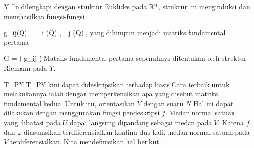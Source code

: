 \mavergleichskette
{\vergleichskette
{ Y
}
{ \subseteq }{ \R^n
}
{  }{
}
{    }{
}
{   }{
}
}
{}{}{}
dilengkapi dengan struktur Euklides pada ${\mathbb R}^n$, struktur ini menginduksi
dan menghasilkan fungsi-fungsi

\mavergleichskettedisp
{\vergleichskette
{ g_{ij}(Q)
}
{ =} { \left\langle  \partial_i \varphi (Q)   ,  \partial_j \varphi (Q)   \right\rangle
}
{ } {
}
{ } {
}
{ } {
}
}
{}{}{,}
yang dihimpun menjadi matriks fundamental pertama
 {} {}

\mavergleichskettedisp
{\vergleichskette
{ G
}
{ =} { \left(  g_{ij}  \right)
}
{ } {
}
{ } {
}
{ } {
}
}
{}{}{}
Matriks fundamental pertama sepenuhnya ditentukan oleh struktur Riemann pada $Y$.

 { T_{P}Y } { T_{P}Y
} {}
kini dapat dideskripsikan terhadap basis
 Cara terbaik untuk melakukannya ialah dengan memperkenalkan apa yang disebut matriks fundamental kedua. Untuk itu, orientasikan $Y$ dengan suatu
$N$
Hal ini dapat dilakukan dengan menggunakan fungsi pendeskripsi $f$. Medan normal satuan yang dibatasi pada $U$ dapat langsung dipandang sebagai medan pada $V$. Karena $f$ dan $\varphi$ diasumsikan terdiferensialkan kontinu dua kali, medan normal satuan pada $V$ terdiferensialkan. Kita mendefinisikan hal berikut.

